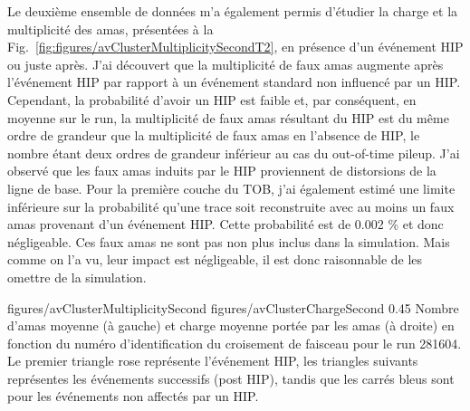 Le deuxième ensemble de données m'a également permis d'étudier la charge et la multiplicité des amas, présentées à la Fig.~\ref{fig:figures/avClusterMultiplicitySecondT2}, en présence d'un événement HIP ou juste après. J'ai découvert que la multiplicité de faux amas augmente après l'événement HIP par rapport à un événement standard non influencé par un HIP. Cependant, la probabilité d'avoir un HIP est faible et, par conséquent, en moyenne sur le run, la multiplicité de faux amas résultant du HIP est du même ordre de grandeur que la multiplicité de faux amas en l'absence de HIP, le nombre  étant deux ordres de grandeur inférieur au cas du out-of-time pileup. J'ai observé que les faux amas induits par le HIP proviennent de distorsions de la ligne de base. Pour la première couche du TOB, j'ai également estimé une limite inférieure sur la probabilité qu'une trace soit reconstruite avec au moins un faux amas provenant d'un événement HIP. Cette probabilité est de 0.002 \% et donc négligeable. Ces faux amas ne sont pas non plus inclus dans la simulation. Mais comme on l’a vu, leur impact est négligeable, il est donc raisonnable de les omettre de la simulation.


                 {figures/avClusterMultiplicitySecond} %
                 {figures/avClusterChargeSecond} %
                 {0.45}       %
                 {Nombre d'amas moyenne (à gauche) et charge moyenne portée par les amas (à droite) en fonction du numéro d'identification du croisement de faisceau pour le run 281604. Le premier triangle rose représente l’événement HIP, les triangles suivants représentes les événements successifs (post HIP), tandis que les carrés bleus sont pour les événements non affectés par un HIP. }




